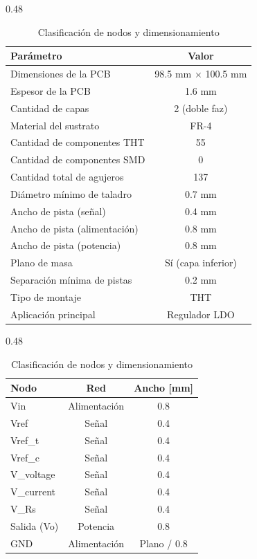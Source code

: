 \documentclass[]{article}
\begin{document}
\begin{table}[h]
	\centering
	
	\begin{subtable}[t]{0.48\textwidth}
		\centering
		\caption{Parámetros principales de la PCB}
		\label{tab:parametros_pcb_LDO}
		\renewcommand{\arraystretch}{1.2}
		\begin{tabular}{|l|c|}
			\hline
			\textbf{Parámetro} & \textbf{Valor} \\
			\hline
			Dimensiones de la PCB & 98.5 mm $\times$ 100.5 mm \\
			Espesor de la PCB & 1.6 mm \\
			Cantidad de capas & 2 (doble faz) \\
			Material del sustrato & FR-4 \\
			\hline
			Cantidad de componentes THT & 55 \\
			Cantidad de componentes SMD & 0 \\
			Cantidad total de agujeros & 137 \\
			Diámetro mínimo de taladro & 0.7 mm \\
			\hline
			Ancho de pista (señal) & 0.4 mm \\
			Ancho de pista (alimentación) & 0.8 mm \\
			Ancho de pista (potencia) & 0.8 mm \\
			\hline
			Plano de masa & Sí (capa inferior) \\
			Separación mínima de pistas & 0.2 mm \\
			\hline
			Tipo de montaje & THT \\
			Aplicación principal & Regulador LDO \\
			\hline
		\end{tabular}
	\end{subtable}
	\hfill
	\begin{subtable}[t]{0.48\textwidth}
		\centering
		\caption{Clasificación de nodos y dimensionamiento}
		\label{tab:nodos_pistas}
		\renewcommand{\arraystretch}{1.2}
		\begin{tabular}{|l|c|c|}
			\hline
			\textbf{Nodo} & \textbf{Red} & \textbf{Ancho [mm]} \\
			\hline
			Vin & Alimentación & 0.8 \\
			Vref & Señal & 0.4 \\
			Vref\_t & Señal & 0.4 \\
			Vref\_c & Señal & 0.4 \\
			V\_voltage & Señal & 0.4 \\
			V\_current & Señal & 0.4 \\
			V\_Rs & Señal & 0.4 \\
			Salida (Vo) & Potencia & 0.8 \\
			GND & Alimentación & Plano / 0.8 \\
			\hline
		\end{tabular}
	\end{subtable}
	
\end{table}
\end{document}
